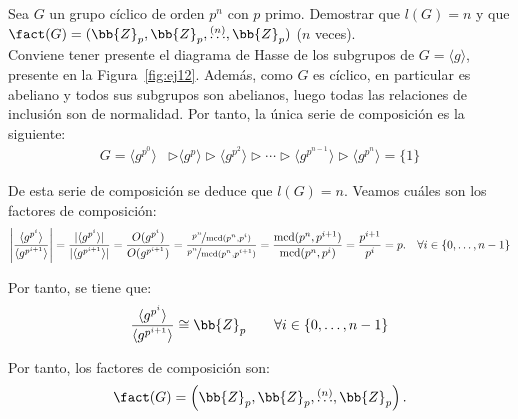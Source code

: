 \begin{ejercicio}\label{ej:5.8}
    Sea $G$ un grupo cíclico de orden $p^n$ con $p$ primo. Demostrar que $l(G) = n$ y que $\fact(G) = (\bb{Z}_p, \bb{Z}_p, \stackrel{(n)}{\ldots}, \bb{Z}_p)$ ($n$ veces).\\

    Conviene tener presente el diagrama de Hasse de los subgrupos de $G=\langle g\rangle$, presente en la Figura~\ref{fig:ej12}. Además, como $G$ es cíclico, en particular es abeliano y todos sus subgrupos son abelianos, luego todas las relaciones de inclusión son de normalidad. Por tanto, la única serie de composición es la siguiente:
    \begin{align*}
        G=\langle g^{p^0}\rangle &\rhd \langle g^{p} \rangle \rhd \langle g^{p^2} \rangle \rhd \cdots \rhd \langle g^{p^{n-1}} \rangle \rhd \langle g^{p^n} \rangle = \{1\}
    \end{align*}

    De esta serie de composición se deduce que $l(G)=n$. Veamos cuáles son los factores de composición:
    \begin{equation*}
        \left|\dfrac{\langle g^{p^i} \rangle}{\langle g^{p^{i+1}} \rangle}\right| = \dfrac{|\langle g^{p^i} \rangle|}{|\langle g^{p^{i+1}} \rangle|} = \dfrac{O(g^{p^i})}{O(g^{p^{i+1}})} = \dfrac{\nicefrac{p^n}{\operatorname{mcd}(p^n, p^i)}}{\nicefrac{p^n}{\operatorname{mcd}(p^n, p^{i+1})}} = \dfrac{\operatorname{mcd}(p^n, p^{i+1})}{\operatorname{mcd}(p^n, p^i)} = \dfrac{p^{i+1}}{p^i} = p.\quad \forall i\in\{0,\ldots,n-1\}
    \end{equation*}

    Por tanto, se tiene que:
    \begin{equation*}
        \dfrac{\langle g^{p^i} \rangle}{\langle g^{p^{i+1}} \rangle} \cong \bb{Z}_p\qquad \forall i\in\{0,\ldots,n-1\}
    \end{equation*}

    Por tanto, los factores de composición son:
    \begin{equation*}
        \fact(G) = \left(\bb{Z}_p, \bb{Z}_p, \stackrel{(n)}{\ldots}, \bb{Z}_p\right).
    \end{equation*}
\end{ejercicio}


